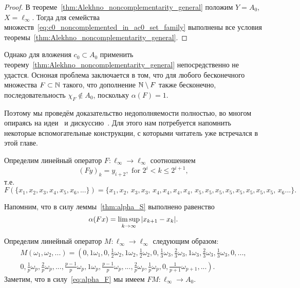 \begin{proof}
	В теореме~\ref{thm:Alekhno_noncomplementarity_general}
	положим $Y=A_0$, $X=\ell_\infty$.
	Тогда для семейства множеств~\eqref{eq:c0_noncomplemented_in_ac0_set_family}
	выполнены все условия теоремы~\ref{thm:Alekhno_noncomplementarity_general}.
\end{proof}

Однако для вложения $c_0 \subset A_0$ применить теорему~\ref{thm:Alekhno_noncomplementarity_general}
непосредственно не удастся.
Осноная проблема заключается в том, что для любого бесконечного множества $F \subset \mathbb{N}$ такого, что
дополнение $\mathbb{N} \setminus F$ также бесконечно, последовательность $\chi_F \notin A_0$,
поскольку $\alpha(F) = 1$.

Поэтому мы проведём доказательство недополняемости полностью,
во многом опираясь на идеи~\cite{whitley1968projecting} и дискуссию~\cite{mathSE_Phillips}.
Для этого нам потребуется напомнить некоторые вспомогательные конструкции,
с которыми читатель уже встречался в этой главе.


Определим линейный оператор  $F:\ell_\infty \to \ell_\infty$ соотношением
\begin{equation}
	\label{operator_F}
	(Fy)_k = y_{i+2}, \mbox{ for } 2^i < k \leq 2^{i+1}
	,
\end{equation}
т.е.
\begin{equation}
	F(\{x_1,x_2,x_3,x_4,x_5,x_6, ...\}) = \{x_1,x_2,\,x_3,x_3,\,x_4,x_4,x_4,x_4,\,x_5,x_5,x_5,x_5,x_5,x_5,x_5,x_5,\,x_6...\}
	.
\end{equation}

Напомним, что в силу леммы~\ref{thm:alpha_S} выполнено равенство
\begin{equation}
	\label{eq:alpha_F}
	\alpha(Fx) = \varlimsup_{k\to\infty} |x_{k+1} - x_{k}|
	.
\end{equation}


Определим линейный оператор $M:\ell_\infty \to \ell_\infty$ следующим образом:
\begin{multline*}
	M(\omega_1,\omega_2,...)=\left(
		0, 1\omega_1,
		0, \frac{1}{2}\omega_2, 1\omega_2, \frac{1}{2}\omega_2,
		0, \frac{1}{3}\omega_3, \frac{2}{3}\omega_3, 1\omega_3, \frac{2}{3}\omega_3, \frac{1}{3}\omega_3,
		0, ...,
	\right. \\ \left.
		0, \frac{1}{p}\omega_p, \frac{2}{p}\omega_p, ..., \frac{p-1}{p}\omega_p, 1\omega_p,
			\frac{p-1}{p}\omega_p, ..., \frac{2}{p}\omega_p, \frac{1}{p}\omega_p,
		0, \frac{1}{p+1}\omega_{p+1}, ...
	\right)
	.
\end{multline*}
Заметим, что в силу~\eqref{eq:alpha_F} мы имеем $FM: \ell_\infty \to A_0$.



